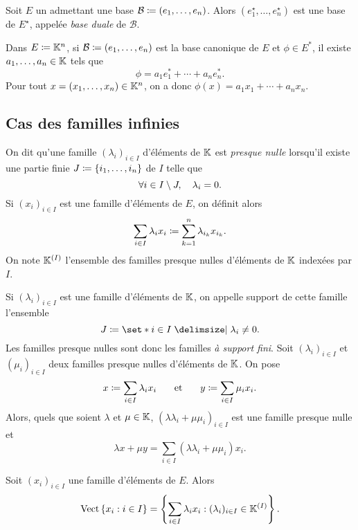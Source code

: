 \documentclass{magnolia}
\begin{document}
\begin{definition}
Soit $E$ un \Kev admettant une base $\mathcal{B}\coloneqq(e_1,\ldots,e_n)$. Alors $(e_1^\star,\ldots,e_n^\star)$
est une base de $E^\star$, appelée \emph{base duale} de $\mathcal{B}$.
\end{definition}

\begin{remarqueUnique}
\remarque Dans $E\coloneqq \mathbb{K}^n$, si $\mathcal{B}\coloneqq(e_1,\ldots,e_n)$ est la base canonique
  de $E$ et $\phi\in E^*$, il existe $a_1,\ldots,a_n\in\mathbb{K}$ tels que
  \[\phi=a_1 e_1^*+\cdots+a_n e_n^*.\]
  Pour tout $x=(x_1,\ldots,x_n)\in\mathbb{K}^n$, on a donc $\phi(x)=a_1 x_1+\cdots+a_n x_n$.
\end{remarqueUnique}

\subsection{Cas des familles infinies}

\begin{definition}
On dit qu'une famille $(\lambda_i)_{i\in I}$ d'éléments de $\mathbb{K}$ est \emph{presque nulle} lorsqu'il existe une partie finie
$J\coloneqq\left\{i_1,\ldots,i_n\right\}$ de $I$ telle que
\[\forall i\in I\setminus J,\quad \lambda_i=0.\]
Si $(x_i)_{i\in I}$ est une famille d'éléments de $E$, on définit alors
\[\sum_{i\in I} \lambda_i x_i \coloneqq \sum_{k=1}^n \lambda_{i_k} x_{i_k}.\]
On note $\mathbb{K}^{(I)}$ l'ensemble des familles presque nulles d'éléments de $\mathbb{K}$ indexées par $I$.
\end{definition}

\begin{remarques}
\remarque Si $(\lambda_i)_{i\in I}$ est une famille d'éléments de $\mathbb{K}$, on appelle support
  de cette famille l'ensemble
  \[J\defeq\enstq{i\in I}{\lambda_i \neq 0}.\]
  Les familles presque nulles sont donc les familles \emph{à support fini}.
\remarque Soit $(\lambda_i)_{i\in I}$ et $(\mu_i)_{i\in I}$ deux familles presque nulles d'éléments de $\mathbb{K}$. On pose
  \[x\coloneqq\sum_{i\in I} \lambda_i x_i \quad\quad\!\text{et}\quad\!\quad y\coloneqq\sum_{i\in I} \mu_i x_i.\]
  Alors, quels que soient $\lambda$ et $\mu\in\mathbb{K}$, $(\lambda\lambda_i+\mu\mu_i)_{i\in I}$ est une famille
  presque nulle et
  \[\lambda x+\mu y=\sum_{i\in I} (\lambda \lambda_i+\mu \mu_i)x_i.\]
\end{remarques}


\begin{proposition}
Soit $(x_i)_{i\in I}$ une famille d'éléments de $E$. Alors
\[\operatorname{Vect}\left\{x_i : i\in I\right\}=\left\{\sum_{i\in I} \lambda_i x_i : (\lambda_i)_{i\in I} \in \mathbb{K}^{(I)}\right\}.\]
\end{proposition}
\end{document}
